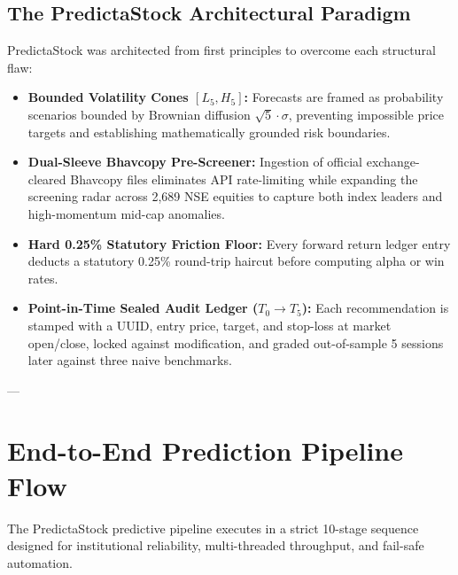\documentclass[11pt,a4paper]{article}
\begin{document}
\subsection{The PredictaStock Architectural Paradigm}
PredictaStock was architected from first principles to overcome each structural flaw:
\begin{itemize}[leftmargin=*]
    \item \textbf{Bounded Volatility Cones $[L_5, H_5]$:} Forecasts are framed as probability scenarios bounded by Brownian diffusion $\sqrt{5} \cdot \sigma$, preventing impossible price targets and establishing mathematically grounded risk boundaries.
    \item \textbf{Dual-Sleeve Bhavcopy Pre-Screener:} Ingestion of official exchange-cleared Bhavcopy files eliminates API rate-limiting while expanding the screening radar across 2,689 NSE equities to capture both index leaders and high-momentum mid-cap anomalies.
    \item \textbf{Hard 0.25\% Statutory Friction Floor:} Every forward return ledger entry deducts a statutory 0.25\% round-trip haircut before computing alpha or win rates.
    \item \textbf{Point-in-Time Sealed Audit Ledger ($T_0 \to T_5$):} Each recommendation is stamped with a UUID, entry price, target, and stop-loss at market open/close, locked against modification, and graded out-of-sample 5 sessions later against three naive benchmarks.
\end{itemize}

---

\section{End-to-End Prediction Pipeline Flow}

The PredictaStock predictive pipeline executes in a strict 10-stage sequence designed for institutional reliability, multi-threaded throughput, and fail-safe automation.
\end{document}
